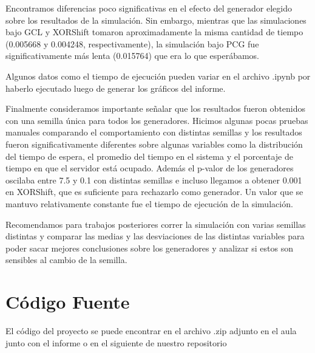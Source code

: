 \documentclass[a4paper, 12pt]{article}
\begin{document}
Encontramos diferencias poco significativas en el efecto del generador elegido sobre los resultados de la simulación.
Sin embargo, mientras que las simulaciones bajo GCL y XORShift
tomaron aproximadamente la misma cantidad de tiempo (0.005668 y 0.004248,
respectivamente), la simulación bajo PCG fue significativamente más lenta 
(0.015764) que era lo que esperábamos.

Algunos datos como el tiempo de ejecución pueden variar en el archivo .ipynb por haberlo ejecutado luego de generar los gráficos del informe.

Finalmente consideramos importante señalar que los resultados fueron obtenidos con una semilla única para todos los generadores. Hicimos algunas pocas pruebas manuales comparando el comportamiento con distintas semillas y los resultados fueron significativamente diferentes sobre algunas variables como la distribución del tiempo de espera, el promedio del tiempo en el sistema y el porcentaje de tiempo en que el servidor está ocupado. Además el p-valor de los generadores oscilaba entre 7.5 y 0.1 con distintas semillas e incluso llegamos a obtener 0.001 en XORShift, que es suficiente para rechazarlo como generador. Un valor que se mantuvo relativamente constante fue el tiempo de ejecución de la simulación.

Recomendamos para trabajos posteriores correr la simulación con varias semillas distintas y comparar las medias y las desviaciones de las distintas variables para poder sacar mejores conclusiones sobre los generadores y analizar si estos son sensibles al cambio de la semilla.

\section{Código Fuente}

El código del proyecto se puede encontrar en el archivo .zip adjunto en el aula junto con el informe o en el siguiente 
\href{https://github.com/slopezpereyra/ModelosTE}{\color{blue}{link}}
de nuestro repositorio
\end{document}
